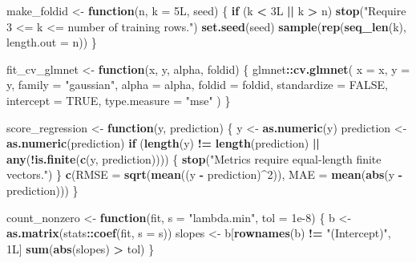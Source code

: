 \documentclass[
  11pt,
]{article}
\newenvironment{Shaded}{\begin{snugshade}}{\end{snugshade}}
\newcommand{\AttributeTok}[1]{\textcolor[rgb]{0.13,0.29,0.53}{#1}}
\newcommand{\ConstantTok}[1]{\textcolor[rgb]{0.56,0.35,0.01}{#1}}
\newcommand{\ControlFlowTok}[1]{\textcolor[rgb]{0.13,0.29,0.53}{\textbf{#1}}}
\newcommand{\DataTypeTok}[1]{\textcolor[rgb]{0.13,0.29,0.53}{#1}}
\newcommand{\DecValTok}[1]{\textcolor[rgb]{0.00,0.00,0.81}{#1}}
\newcommand{\FloatTok}[1]{\textcolor[rgb]{0.00,0.00,0.81}{#1}}
\newcommand{\FunctionTok}[1]{\textcolor[rgb]{0.13,0.29,0.53}{\textbf{#1}}}
\newcommand{\NormalTok}[1]{#1}
\newcommand{\OtherTok}[1]{\textcolor[rgb]{0.56,0.35,0.01}{#1}}
\newcommand{\SpecialCharTok}[1]{\textcolor[rgb]{0.81,0.36,0.00}{\textbf{#1}}}
\newcommand{\StringTok}[1]{\textcolor[rgb]{0.31,0.60,0.02}{#1}}
\begin{document}
\begin{Shaded}
\begin{Highlighting}[]
\NormalTok{make\_foldid }\OtherTok{\textless{}{-}} \ControlFlowTok{function}\NormalTok{(n, }\AttributeTok{k =} \DecValTok{5}\DataTypeTok{L}\NormalTok{, seed) \{}
  \ControlFlowTok{if}\NormalTok{ (k }\SpecialCharTok{\textless{}} \DecValTok{3}\DataTypeTok{L} \SpecialCharTok{||}\NormalTok{ k }\SpecialCharTok{\textgreater{}}\NormalTok{ n) }\FunctionTok{stop}\NormalTok{(}\StringTok{"Require 3 \textless{}= k \textless{}= number of training rows."}\NormalTok{)}
  \FunctionTok{set.seed}\NormalTok{(seed)}
  \FunctionTok{sample}\NormalTok{(}\FunctionTok{rep}\NormalTok{(}\FunctionTok{seq\_len}\NormalTok{(k), }\AttributeTok{length.out =}\NormalTok{ n))}
\NormalTok{\}}

\NormalTok{fit\_cv\_glmnet }\OtherTok{\textless{}{-}} \ControlFlowTok{function}\NormalTok{(x, y, alpha, foldid) \{}
\NormalTok{  glmnet}\SpecialCharTok{::}\FunctionTok{cv.glmnet}\NormalTok{(}
    \AttributeTok{x =}\NormalTok{ x,}
    \AttributeTok{y =}\NormalTok{ y,}
    \AttributeTok{family =} \StringTok{"gaussian"}\NormalTok{,}
    \AttributeTok{alpha =}\NormalTok{ alpha,}
    \AttributeTok{foldid =}\NormalTok{ foldid,}
    \AttributeTok{standardize =} \ConstantTok{FALSE}\NormalTok{,}
    \AttributeTok{intercept =} \ConstantTok{TRUE}\NormalTok{,}
    \AttributeTok{type.measure =} \StringTok{"mse"}
\NormalTok{  )}
\NormalTok{\}}

\NormalTok{score\_regression }\OtherTok{\textless{}{-}} \ControlFlowTok{function}\NormalTok{(y, prediction) \{}
\NormalTok{  y }\OtherTok{\textless{}{-}} \FunctionTok{as.numeric}\NormalTok{(y)}
\NormalTok{  prediction }\OtherTok{\textless{}{-}} \FunctionTok{as.numeric}\NormalTok{(prediction)}
  \ControlFlowTok{if}\NormalTok{ (}\FunctionTok{length}\NormalTok{(y) }\SpecialCharTok{!=} \FunctionTok{length}\NormalTok{(prediction) }\SpecialCharTok{||} \FunctionTok{any}\NormalTok{(}\SpecialCharTok{!}\FunctionTok{is.finite}\NormalTok{(}\FunctionTok{c}\NormalTok{(y, prediction)))) \{}
    \FunctionTok{stop}\NormalTok{(}\StringTok{"Metrics require equal{-}length finite vectors."}\NormalTok{)}
\NormalTok{  \}}
  \FunctionTok{c}\NormalTok{(}\AttributeTok{RMSE =} \FunctionTok{sqrt}\NormalTok{(}\FunctionTok{mean}\NormalTok{((y }\SpecialCharTok{{-}}\NormalTok{ prediction)}\SpecialCharTok{\^{}}\DecValTok{2}\NormalTok{)),}
    \AttributeTok{MAE =} \FunctionTok{mean}\NormalTok{(}\FunctionTok{abs}\NormalTok{(y }\SpecialCharTok{{-}}\NormalTok{ prediction)))}
\NormalTok{\}}

\NormalTok{count\_nonzero }\OtherTok{\textless{}{-}} \ControlFlowTok{function}\NormalTok{(fit, }\AttributeTok{s =} \StringTok{"lambda.min"}\NormalTok{, }\AttributeTok{tol =} \FloatTok{1e{-}8}\NormalTok{) \{}
\NormalTok{  b }\OtherTok{\textless{}{-}} \FunctionTok{as.matrix}\NormalTok{(stats}\SpecialCharTok{::}\FunctionTok{coef}\NormalTok{(fit, }\AttributeTok{s =}\NormalTok{ s))}
\NormalTok{  slopes }\OtherTok{\textless{}{-}}\NormalTok{ b[}\FunctionTok{rownames}\NormalTok{(b) }\SpecialCharTok{!=} \StringTok{"(Intercept)"}\NormalTok{, }\DecValTok{1}\DataTypeTok{L}\NormalTok{]}
  \FunctionTok{sum}\NormalTok{(}\FunctionTok{abs}\NormalTok{(slopes) }\SpecialCharTok{\textgreater{}}\NormalTok{ tol)}
\NormalTok{\}}


\end{Highlighting}
\end{Shaded}
\end{document}
